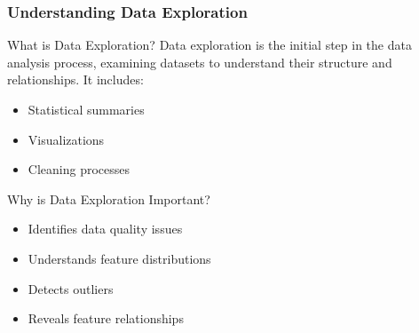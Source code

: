\documentclass[aspectratio=169]{beamer}
\begin{document}
\begin{frame}[fragile]
    \frametitle{Understanding Data Exploration}
    \begin{block}{What is Data Exploration?}
        Data exploration is the initial step in the data analysis process, examining datasets to understand their structure and relationships. It includes:
        \begin{itemize}
            \item Statistical summaries
            \item Visualizations
            \item Cleaning processes
        \end{itemize}
    \end{block}
    
    \begin{block}{Why is Data Exploration Important?}
        \begin{itemize}
            \item Identifies data quality issues
            \item Understands feature distributions
            \item Detects outliers
            \item Reveals feature relationships
        \end{itemize}
    \end{block}
\end{frame}
\end{document}

